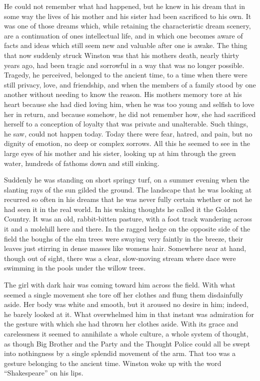 He could not remember what had happened, but he knew in his dream that
in some way the lives of his mother and his sister had been sacrificed
to his own. It was one of those dreams which, while retaining the
characteristic dream scenery, are a continuation of
one\textquotesingle s intellectual life, and in which one becomes aware
of facts and ideas which still seem new and valuable after one is awake.
The thing that now suddenly struck Winston was that his
mother\textquotesingle s death, nearly thirty years ago, had been tragic
and sorrowful in a way that was no longer possible. Tragedy, he
perceived, belonged to the ancient time, to a time when there were still
privacy, love, and friendship, and when the members of a family stood by
one another without needing to know the reason. His
mother\textquotesingle s memory tore at his heart because she had died
loving him, when he was too young and selfish to love her in return, and
because somehow, he did not remember how, she had sacrificed herself to
a conception of loyalty that was private and unalterable. Such things,
he saw, could not happen today. Today there were fear, hatred, and pain,
but no dignity of emotion, no deep or complex sorrows. All this he
seemed to see in the large eyes of his mother and his sister, looking up
at him through the green water, hundreds of fathoms down and still
sinking.

Suddenly he was standing on short springy turf, on a summer evening when
the slanting rays of the sun gilded the ground. The landscape that he
was looking at recurred so often in his dreams that he was never fully
certain whether or not he had seen it in the real world. In his waking
thoughts he called it the Golden Country. It was an old, rabbit-bitten
pasture, with a foot track wandering across it and a molehill here and
there. In the ragged hedge on the opposite side of the field the boughs
of the elm trees were swaying very faintly in the breeze, their leaves
just stirring in dense masses like women\textquotesingle s hair.
Somewhere near at hand, though out of sight, there was a clear,
slow-moving stream where dace were swimming in the pools under the
willow trees.

The girl with dark hair was coming toward him across the field. With
what seemed a single movement she tore off her clothes and flung them
disdainfully aside. Her body was white and smooth, but it aroused no
desire in him; indeed, he barely looked at it. What overwhelmed him in
that instant was admiration for the gesture with which she had thrown
her clothes aside. With its grace and carelessness it seemed to
annihilate a whole culture, a whole system of thought, as though Big
Brother and the Party and the Thought Police could all be swept into
nothingness by a single splendid movement of the arm. That too was a
gesture belonging to the ancient time. Winston woke up with the word
``Shakespeare'' on his lips.


